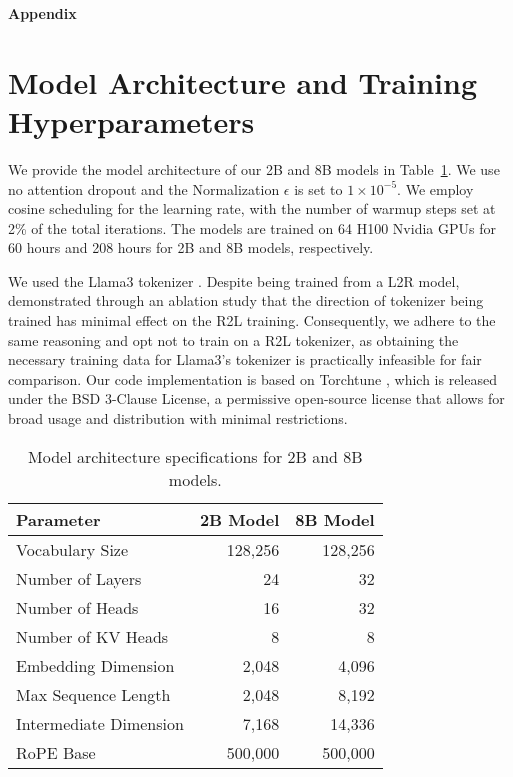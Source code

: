 \appendix
\onecolumn
\begin{center}
    {\Large \bf Appendix}
\end{center}
\section{Model Architecture and Training Hyperparameters}
\label{app:arch}
We provide the model architecture of our 2B and 8B models in Table~\ref{tab:model_architecture}. We use no attention dropout and the Normalization $\epsilon$ is set to $1 \times 10^{-5}$.  
We employ cosine scheduling for the learning rate, with the number of warmup steps set at 2\% of the total iterations. The models are trained on 64 H100 Nvidia GPUs for 60 hours and 208 hours for 2B and 8B models, respectively. 


We used the Llama3 tokenizer \citep{dubey2024llama3}. Despite being trained from a L2R model, \citet{papadopoulos2024arrows} demonstrated through an ablation study that the direction of tokenizer being trained has minimal effect on the R2L training. Consequently, we adhere to the same reasoning and opt not to train on a R2L tokenizer, as obtaining the necessary training data for Llama3's tokenizer is practically infeasible for fair comparison.
Our code implementation is based on Torchtune \citep{pytorch2024torchtune}, which is released under the BSD 3-Clause License, a permissive open-source license that allows for broad usage and distribution with minimal restrictions. 

\begin{table}[!htp]\centering
{}
    \caption{Model architecture specifications for 2B and 8B models.}\label{tab:model_architecture}
    \begin{tabular}{lrr}\toprule
    Parameter & 2B Model & 8B Model \\\midrule
    Vocabulary Size & 128,256 & 128,256 \\
    Number of Layers & 24 & 32 \\
    Number of Heads & 16 & 32 \\
    Number of KV Heads & 8 & 8 \\
    Embedding Dimension & 2,048 & 4,096 \\
    Max Sequence Length & 2,048 & 8,192 \\
    Intermediate Dimension & 7,168 & 14,336 \\
    RoPE Base & 500,000 & 500,000 \\
    \bottomrule
    \end{tabular}
\end{table}


